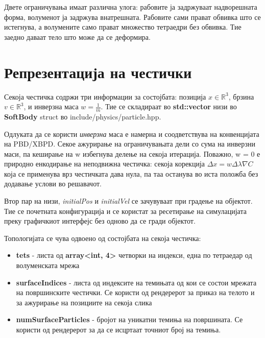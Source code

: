 Двете ограничувања имаат различна улога: рабовите ја задржуваат надворешната форма, волуменот ја задржува внатрешната. Рабовите сами прават обвивка што се истегнува, а волумените само прават множество тетраедри без обвивка. Тие заедно даваат тело што може да се деформира.


\section{Репрезентација на честички}
Секоја честичка содржи три информации за состојбата: позиција $x \in \mathbb{R}^3$, брзина $v \in \mathbb{R}^3$, и инверзна маса $w = \frac{1}{m}$. Тие се складираат во \textbf{std::vector} низи во \textbf{SoftBody} struct во include/physics/particle.hpp.

Одлуката да се користи \textit{инверзна} маса е намерна и соодветствува на конвенцијата на PBD/XBPD. Секое ажурирање на ограничувањата дели со сума на инверзни маси, па кеширање на w избегнува делење на секоја итерација. Поважно, w = 0 е природно енкодирање на неподвижна честичка: секоја корекција $\Delta x = w \Delta\lambda \nabla C$ која се применува врз честичката дава нула, па таа останува во иста положба без додавање услови во решавачот. 

Втор пар на низи, \textit{initialPos} и \textit{initialVel} се зачувуваат при градење на објектот. Тие се почетната конфигурација и се користат за ресетирање на симулацијата преку графичкиот интерфејс без одново да се гради објектот.

Топологијата се чува одвоено од состојбата на секоја честичка:
\begin{itemize}
	\item \textbf{tets} - листа од \textbf{array<int, 4>} четворки на индекси, една по тетраедар од волуменската мрежа
	\item \textbf{surfaceIndices} - листа од индексите на темињата од кои се состои мрежата на површинските честички. Се користи од рендерерот за приказ на телото и за ажурирање на позициите на секоја слика
	\item \textbf{numSurfaceParticles} - бројот на уникатни темиња на површината. Се користи од рендерерот за да се исцртаат точниот број на темиња.
\end{itemize}

